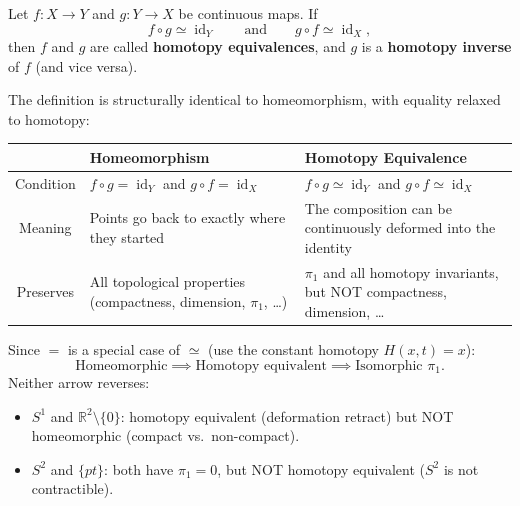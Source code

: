 \documentclass[11pt]{report}
\begin{document}
\begin{defbox}
Let $f: X \to Y$ and $g: Y \to X$ be continuous maps. If
\[f \circ g \simeq \operatorname{id}_Y \qquad \text{and} \qquad g \circ f \simeq \operatorname{id}_X,\]
then $f$ and $g$ are called \textbf{homotopy equivalences}, and $g$ is a \textbf{homotopy inverse} of $f$ (and vice versa).
\end{defbox}

\begin{rembox}
The definition is structurally identical to homeomorphism, with equality relaxed to homotopy:

\begin{center}
\small
\begin{tabular}{|c|p{5cm}|p{5.5cm}|}
\hline
& \textbf{Homeomorphism} & \textbf{Homotopy Equivalence} \\
\hline
Condition & $f \circ g = \operatorname{id}_Y$ and $g \circ f = \operatorname{id}_X$ & $f \circ g \simeq \operatorname{id}_Y$ and $g \circ f \simeq \operatorname{id}_X$ \\
\hline
Meaning & Points go back to exactly where they started & The composition can be continuously deformed into the identity \\
\hline
Preserves & All topological properties (compactness, dimension, $\pi_1$, \ldots) & $\pi_1$ and all homotopy invariants, but NOT compactness, dimension, \ldots \\
\hline
\end{tabular}
\end{center}

Since $=$ is a special case of $\simeq$ (use the constant homotopy $H(x,t) = x$):
\[\text{Homeomorphic} \implies \text{Homotopy equivalent} \implies \text{Isomorphic } \pi_1.\]
Neither arrow reverses:
\begin{itemize}[nosep]
    \item $S^1$ and $\mathbb{R}^2 \setminus \{0\}$: homotopy equivalent (deformation retract) but NOT homeomorphic (compact vs.\ non-compact).
    \item $S^2$ and $\{pt\}$: both have $\pi_1 = 0$, but NOT homotopy equivalent ($S^2$ is not contractible).
\end{itemize}
\end{rembox}
\end{document}
